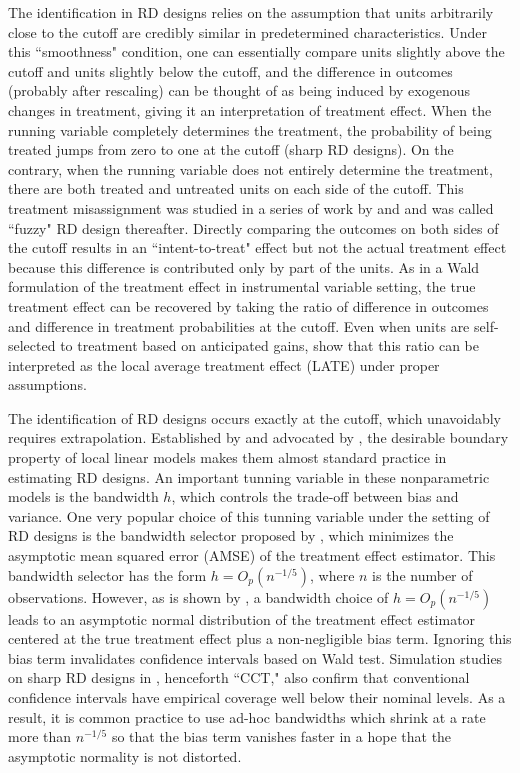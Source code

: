 \documentclass[12pt,]{article}
\DeclareMathOperator{\1}{\mathbbm{1}}
\begin{document}
The identification in RD designs relies on the assumption that units arbitrarily close to the cutoff are credibly similar in predetermined characteristics. Under this ``smoothness" condition, one can essentially compare units slightly above the cutoff and units slightly below the cutoff, and the difference in outcomes (probably after rescaling) can be thought of as being induced by exogenous changes in treatment, giving it an interpretation of treatment effect. When the running variable completely determines the treatment, the probability of being treated jumps from zero to one at the cutoff (sharp RD designs). On the contrary, when the running variable does not entirely determine the treatment, there are both treated and untreated units on each side of the cutoff. This treatment misassignment was studied in a series of work by \cite{trochim1980relative} and \cite{trochim1984research} and was called ``fuzzy" RD design thereafter. Directly comparing the outcomes on both sides of the cutoff results in an ``intent-to-treat" effect but not the actual treatment effect because this difference is contributed only by part of the units. As in a Wald formulation of the treatment effect in instrumental variable setting, the true treatment effect can be recovered by taking the ratio of difference in outcomes and difference in treatment probabilities at the cutoff. Even when units are self-selected to treatment based on anticipated gains, \cite{hahn2001identification} show that this ratio can be interpreted as the local average treatment effect (LATE) under proper assumptions.

The identification of RD designs occurs exactly at the cutoff, which unavoidably requires extrapolation. Established by \cite{fan1992design} and advocated by \cite{hahn2001identification}, the desirable boundary property of local linear models makes them almost standard practice in estimating RD designs. An important tunning variable in these nonparametric models is the bandwidth $h$, which controls the trade-off between bias and variance. One very popular choice of this tunning variable under the setting of RD designs is the bandwidth selector proposed by \cite{imbens2011optimal}, which minimizes the asymptotic mean squared error (AMSE) of the treatment effect estimator. This bandwidth selector has the form $h = O_p(n^{-1/5})$, where $n$ is the number of observations. However, as is shown by \cite{hahn2001identification}, a bandwidth choice of $h = O_p(n^{-1/5})$ leads to an asymptotic normal distribution of the treatment effect estimator centered at the true treatment effect plus a non-negligible bias term. Ignoring this bias term invalidates confidence intervals based on Wald test. Simulation studies on sharp RD designs in \cite{calonico2014robust}, henceforth ``CCT," also confirm that conventional confidence intervals have empirical coverage well below their nominal levels. As a result, it is common practice to use ad-hoc bandwidths which shrink at a rate more than $n^{-1/5}$ so that the bias term vanishes faster in a hope that the asymptotic normality is not distorted.
\end{document}
